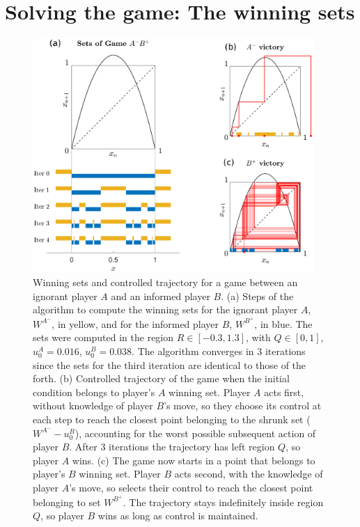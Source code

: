 \section{Solving the game: The winning sets}




\begin{figure}[h!]
    \centering
    \includegraphics[trim={0.8cm 0cm 0cm 0cm}, clip,width=0.95\textwidth ]{Images/P5/setsAB_control.eps}
    \caption{ Winning sets and controlled trajectory for a game between an ignorant player $A$ and an informed player $B$. (a) Steps of the algorithm to compute the winning sets for the ignorant player $A$, $W^{A^-}$, in yellow, and for the informed player $B$, $W^{B^+}$, in blue. The sets were computed in the region $R\in [-0.3,1.3]$, with $Q\in[0,1]$, $u_0^A=0.016$, $u_0^B=0.038$. The algorithm converges in $3$ iterations since  the sets for the third iteration are identical to those of the forth. (b) Controlled trajectory of the game when the initial condition belongs to player's $A$ winning set. Player $A$ acts first, without knowledge of player $B$'s move, so they choose its control at each step to reach the closest point belonging to the shrunk set ($W^{A^-} -u^B_0$), accounting for the worst possible subsequent action of player $B$. After $3$ iterations the trajectory has left region $Q$, so player $A$ wins. (c) The game now starts in a point that belongs to player's $B$ winning set. Player $B$ acts second, with the knowledge of player $A$'s move, so selects their control to reach the closest point belonging to set $W^{B^+}$. The trajectory stays indefinitely inside region $Q$, so player $B$ wins as long as control is maintained.}
    \label{fig:tray}
\end{figure}



